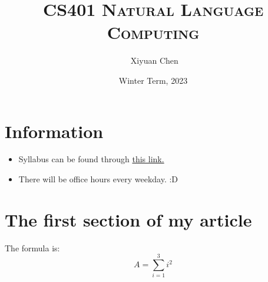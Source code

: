 \documentclass{ainote}
\author{\ccLogo \,\,Xiyuan Chen}
\title{\textsc{CS401 Natural Language Computing}}
\date{Winter Term, 2023}
\begin{document}
\maketitle
\doclicenseThis
\section*{Information}
\begin{itemize}
	\item Syllabus can be found through \href{https://q.utoronto.ca/courses/181228/files/8680178/preview}{this link. }
	\item There will be office hours every weekday. :D
\end{itemize}
\tableofcontents
\newpage

\section{The first section of my article}
\begin{info}
    The formula is: 
    \begin{equation}
    \label{eqa:1}
        A=\sum_{i=1}^3 i^2
    \end{equation}
\end{info}
\end{document}
